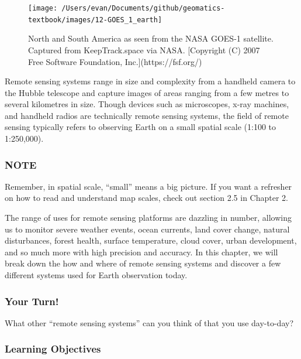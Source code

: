 \documentclass[
]{book}
\begin{document}
\begin{figure}
\texttt{[image: /Users/evan/Documents/github/geomatics-textbook/images/12-GOES\_1\_earth]} \caption{North and South America as seen from the NASA GOES-1 satellite. Captured from KeepTrack.space via NASA. [Copyright (C) 2007 Free Software Foundation, Inc.](https://fsf.org/)}\label{fig:12-GOES-1-earth}
\end{figure}

Remote sensing systems range in size and complexity from a handheld camera to the Hubble telescope and capture images of areas ranging from a few metres to several kilometres in size. Though devices such as microscopes, x-ray machines, and handheld radios are technically remote sensing systems, the field of remote sensing typically refers to observing Earth on a small spatial scale (1:100 to 1:250,000).

\hypertarget{note}{%
\subsubsection*{NOTE}\label{note}}

Remember, in spatial scale, ``small'' means a big picture. If you want a refresher on how to read and understand map scales, check out section 2.5 in Chapter 2.

The range of uses for remote sensing platforms are dazzling in number, allowing us to monitor severe weather events, ocean currents, land cover change, natural disturbances, forest health, surface temperature, cloud cover, urban development, and so much more with high precision and accuracy. In this chapter, we will break down the how and where of remote sensing systems and discover a few different systems used for Earth observation today.

\hypertarget{your-turn-5}{%
\subsubsection*{Your Turn!}\label{your-turn-5}}

What other ``remote sensing systems'' can you think of that you use day-to-day?

\hypertarget{learning-objectives-11}{%
\subsubsection*{Learning Objectives}\label{learning-objectives-11}}
\end{document}
